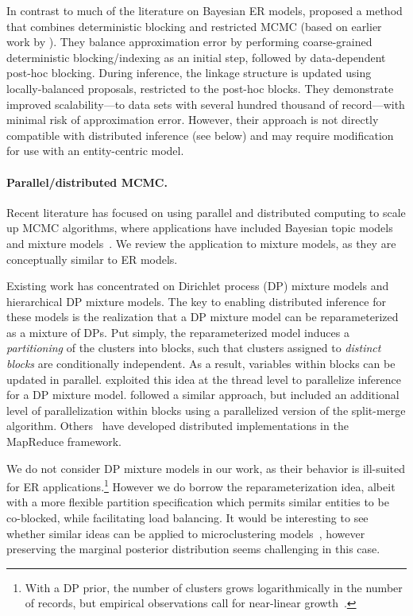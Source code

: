 \documentclass[12pt,letterpaper]{article}
\newcommand{\1}[1]{\mathbb{I}\!\left[#1\right]} %
\begin{document}
In contrast to much of the literature on Bayesian ER models, 
\citet{mcveigh_scaling_2019} proposed a method that combines deterministic 
blocking and restricted MCMC (based on earlier work by 
\citealp{mcveigh_practical_2017}). 
They balance approximation error by performing coarse-grained 
deterministic blocking\slash indexing as an initial step, followed by 
data-dependent post-hoc blocking.
During inference, the linkage structure is updated using locally-balanced 
proposals, restricted to the post-hoc blocks. 
They demonstrate improved scalability---to data sets with several hundred 
thousand of record---with minimal risk of approximation error. 
However, their approach is not directly compatible with distributed 
inference (see below) and may require modification for use with an 
entity-centric model.

\paragraph{Parallel\slash distributed MCMC.}
Recent literature has focused on using parallel and distributed computing to 
scale up MCMC algorithms, where applications have included Bayesian topic 
models~\citep{newman_distributed_2009, smola_architecture_2010, 
ahn_distributed_2014} and mixture models~\citep{williamson_parallel_2013, 
chang_parallel_2013, lovell_clustercluster:_2013, ge_distributed_2015}.
We review the application to mixture models, as they are 
conceptually similar to ER models.

Existing work has concentrated on Dirichlet process (DP) mixture models and 
hierarchical DP mixture models.
The key to enabling distributed inference for these models is the 
realization that a DP mixture model can be reparameterized as a mixture of 
DPs.
Put simply, the reparameterized model induces a \emph{partitioning} of the 
clusters into blocks, such that clusters assigned to \emph{distinct blocks} 
are conditionally independent. 
As a result, variables within blocks can be updated in parallel.
\cite{williamson_parallel_2013} exploited this idea at the thread level 
to parallelize inference for a DP mixture model.
\cite{chang_parallel_2013} followed a similar approach, but included an 
additional level of parallelization within blocks using a parallelized 
version of the split-merge algorithm.
Others~\citep{lovell_clustercluster:_2013, ge_distributed_2015} have 
developed distributed implementations in the MapReduce framework. 

We do not consider DP mixture models in our work, as their behavior 
is ill-suited for ER applications.\footnote{With a DP prior, the 
number of clusters grows logarithmically in the number of records, 
but empirical observations call for near-linear 
growth~\citep{zanella_flexible_2016}.}
However we do borrow the reparameterization idea, albeit with a more flexible 
partition specification which permits similar entities to be co-blocked, 
while facilitating load balancing.
It would be interesting to see whether similar ideas can be applied to 
microclustering models~\citep{zanella_flexible_2016}, 
however preserving the marginal posterior distribution seems 
challenging in this case.
\end{document}
